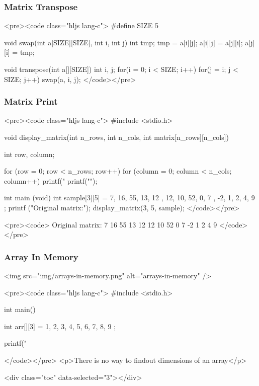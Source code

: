 \documentclass{../c-lecture}
\begin{document}
\begin{frame}
  \frametitle{Matrix Transpose}
  <pre><code class="hljs lang-c">
#define SIZE 5

void swap(int a[SIZE][SIZE], int i, int j){
  int tmp;
  tmp = a[i][j];
  a[i][j] = a[j][i];
  a[j][i] = tmp;
}

void transpose(int a[][SIZE]){
  int i, j;
  for(i = 0; i < SIZE; i++)
    for(j = i; j < SIZE; j++)
      swap(a, i, j);
}
  </code></pre>
\end{frame}
\begin{frame}
  \begin{frame}
    \frametitle{Matrix Print}
    <pre><code class="hljs lang-c">
#include <stdio.h>

void display_matrix(int n_rows, int n_cols, int matrix[n_rows][n_cols]) {
  int row, column;

  for (row = 0; row < n_rows; row++) {
    for (column = 0; column < n_cols; column++)
      printf("%
    printf("\n");
  }
}

int main (void){
  int sample[3][5] =
    {
      { 7, 16, 55, 13, 12 },
      { 12, 10, 52, 0, 7 },
      { -2, 1, 2, 4, 9 }
    };
    printf ("Original matrix:\n");
    display_matrix(3, 5, sample);
}
    </code></pre>
  \end{frame}
  \begin{frame}
    <pre><code>
Original matrix:
    7    16    55    13    12
   12    10    52     0     7
   -2     1     2     4     9
    </code></pre>
  \end{frame}
\end{frame}
\begin{frame}
  \begin{frame}
    \frametitle{Array In Memory}
    <img src="img/arrays-in-memory.png" alt="arrays-in-memory" />
  \end{frame}
  \begin{frame}
    <pre><code class="hljs lang-c">
#include <stdio.h>


int main() {
  int arr[][3] = { {1, 2, 3}, {4, 5, 6}, {7, 8, 9} };

  printf("%
}
    </code></pre>
    <p>There is no way to findout dimensions of an array</p>
  \end{frame}
\end{frame}
\begin{frame}
  <div class="toc" data-selected="3"></div>
\end{frame}
\end{document}
